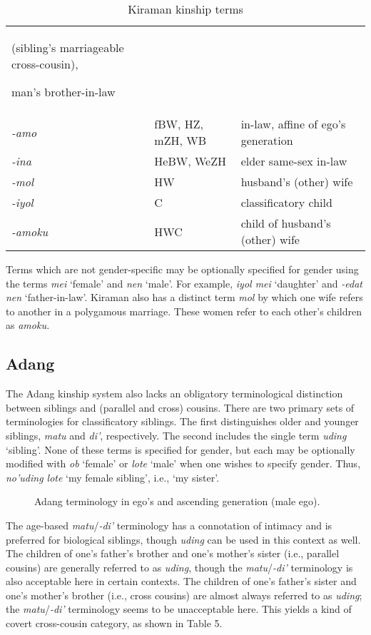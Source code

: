 \begin{table}
\begin{tabular}{p{3cm}p{3cm}p{5cm}}
(sibling's marriageable cross-cousin),

man's brother-in-law\\
\textit{{}-amo} & fBW, HZ, mZH, WB & in-law, affine of ego's generation\\
\textit{{}-ina} & HeBW, WeZH & elder same-sex in-law\\
\textit{{}-mol} & HW & husband's (other) wife\\
\textit{{}-iyol} & C & classificatory child\\
\textit{{}-amoku} & HWC & child of husband's (other) wife\\
\end{tabular}

\caption{Kiraman kinship terms}
\end{table}

Terms which are not gender-specific may be optionally specified for gender using the terms \textit{mei} `female' and \textit{nen} `male'. For example, \textit{iyol mei} `daughter' and \textit{{}-edat nen} `father-in-law'. Kiraman also has a distinct term \textit{mol} by which one wife refers to another in a polygamous marriage. These women refer to each other's children as \textit{amoku.}

\subsection{Adang}
The Adang kinship system also lacks an obligatory terminological distinction between siblings and (parallel and cross) cousins. There are two primary sets of terminologies for classificatory siblings. The first distinguishes older and younger siblings, \textit{matu} and \textit{di'}, respectively. The second includes the single term \textit{uding} `sibling'. None of these terms is specified for gender, but each may be optionally modified with \textit{ob} `female' or \textit{lote} `male' when one wishes to specify gender. Thus, \textit{no'uding lote} `my female sibling', i.e., `my sister'.

\begin{figure}
\caption{Adang terminology in ego's and ascending generation (male ego). }
\end{figure}

The age-based \textit{matu}/\textit{{}-di'} terminology has a connotation of intimacy and is preferred for biological siblings, though \textit{uding} can be used in this context as well. The children of one's father's brother and one's mother's sister (i.e., parallel cousins) are generally referred to as \textit{uding}, though the \textit{matu}/\textit{{}-di'} terminology is also acceptable here in certain contexts. The children of one's father's sister and one's mother's brother (i.e., cross cousins) are almost always referred to as \textit{uding}; the \textit{matu}/\textit{{}-di'} terminology seems to be unacceptable here. This yields a kind of covert cross-cousin category, as shown in Table 5.




